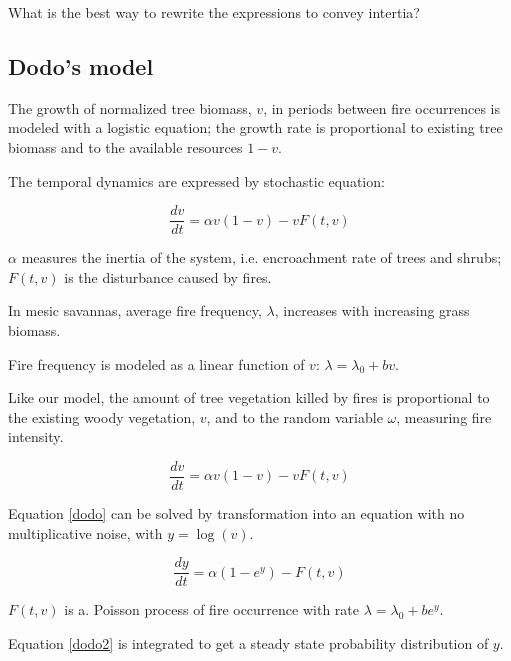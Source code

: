 \documentclass[12pt]{article}
\begin{document}
What is the best way to rewrite the expressions to convey intertia? 



\subsection{Dodo's model}

The growth of normalized tree biomass, $v$, in periods between fire occurrences is modeled with a logistic equation;
the growth rate is proportional to existing tree biomass and to the available resources $1-v$.

The temporal dynamics are expressed by stochastic equation:

\begin{equation}
\frac{dv}{dt} = \alpha v ( 1- v) - v F(t, v)
\label{dodo}
\end{equation}

$\alpha$ measures the inertia of the system, i.e. encroachment rate of trees and shrubs;
$F(t,v) $ is the disturbance caused by fires.

In mesic savannas, average fire frequency, $\lambda$, increases with increasing grass biomass.


Fire frequency is modeled as a linear function of $v$:
$\lambda  = \lambda_0 + bv$.

Like our model, 
the amount of tree vegetation killed by fires is proportional to the existing woody vegetation, $v$, and to the random variable $\omega$, measuring fire intensity.


\begin{equation}
\frac{dv}{dt} = \alpha v ( 1- v) - v F(t, v)
\end{equation}


Equation \ref{dodo} can be solved by transformation into an equation with no multiplicative noise, with $y = \log(v)$.

\begin{equation}
\frac{dy}{dt} = \alpha  ( 1- e^y ) -  F(t, v)
\label{dodo2}
\end{equation}

$F(t,v)$ is a. Poisson process of fire occurrence with rate $\lambda = \lambda_0 + b e^y$.

Equation \ref{dodo2} is integrated to get a steady state probability distribution of $y$.
\end{document}
